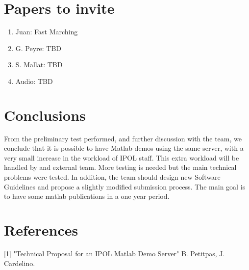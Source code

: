 \section{Papers to invite}
\begin{enumerate}
\item Juan: Fast Marching
\item G. Peyre: TBD
\item S. Mallat: TBD
\item Audio: TBD
\end{enumerate}

\section{Conclusions}
From the preliminary test performed, and further discussion with the team, we conclude that it is possible to have Matlab demos using the same server, with a very small increase in the workload of IPOL staff. This extra workload will be handled by and external team. More testing is needed but the main technical problems were tested.
In addition, the team should design new Software Guidelines and propose a slightly modified submission process.
The main goal is to have some matlab publications in a one year period.

\section{References}
[1] "Technical Proposal for an IPOL Matlab Demo Server" B. Petitpas, J. Cardelino. 
